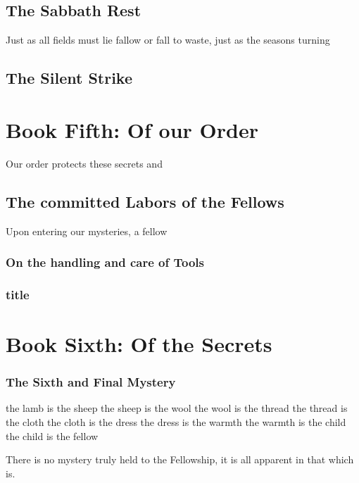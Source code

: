 \documentclass[10pt]{book}
\begin{document}
\section{The Sabbath Rest}
Just as all fields must lie fallow or fall to waste, just as the seasons turning 
\section{The Silent Strike}

\subsection{}
\chapter[Book Fifth]{Book Fifth: Of our Order}
Our order protects these secrets and 
\section{ The committed Labors of the Fellows }
Upon entering our mysteries, a fellow 

\subsection{On the handling and care of Tools}

\subsection{title}
\chapter[Book Sixth]{Book Sixth: Of the Secrets }

\subsection{The Sixth and Final Mystery}
the lamb is the sheep 
the sheep is the wool 
the wool is the thread 
the thread is the cloth 
the cloth is the dress 
the dress is the warmth
the warmth is the child 
the child is the fellow

 There is no mystery truly held to the Fellowship, it is all apparent in that which is.
 
\end{document}
